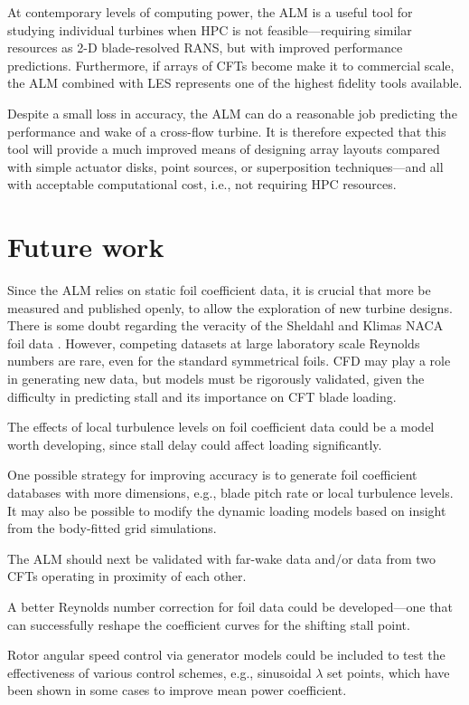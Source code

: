 At contemporary levels of computing power, the ALM is a useful tool for studying
individual turbines when HPC is not feasible---requiring similar resources as
2-D blade-resolved RANS, but with improved performance predictions. Furthermore,
if arrays of CFTs become make it to commercial scale, the ALM combined with LES
represents one of the highest fidelity tools available.

Despite a small loss in accuracy, the ALM can do a reasonable job predicting the
performance and wake of a cross-flow turbine. It is therefore expected that this
tool will provide a much improved means of designing array layouts compared with
simple actuator disks, point sources, or superposition techniques---and all with
acceptable computational cost, i.e., not requiring HPC resources.


\section{Future work}

Since the ALM relies on static foil coefficient data, it is crucial that more be
measured and published openly, to allow the exploration of new turbine designs.
There is some doubt regarding the veracity of the Sheldahl and Klimas NACA foil
data \cite{Bedon2014}. However, competing datasets at large laboratory scale
Reynolds numbers are rare, even for the standard symmetrical foils. CFD may play
a role in generating new data, but models must be rigorously validated, given
the difficulty in predicting stall and its importance on CFT blade loading.

The effects of local turbulence levels on foil coefficient data could be a model
worth developing, since stall delay could affect loading significantly.

One possible strategy for improving accuracy is to generate foil coefficient
databases with more dimensions, e.g., blade pitch rate or local turbulence
levels. It may also be possible to modify the dynamic loading models based on
insight from the body-fitted grid simulations.

The ALM should next be validated with far-wake data and/or data from two CFTs
operating in proximity of each other.

A better Reynolds number correction for foil data could be developed---one that
can successfully reshape the coefficient curves for the shifting stall point.

Rotor angular speed control via generator models could be included to test the
effectiveness of various control schemes, e.g., sinusoidal $\lambda$ set points,
which have been shown in some cases to improve mean power coefficient.

